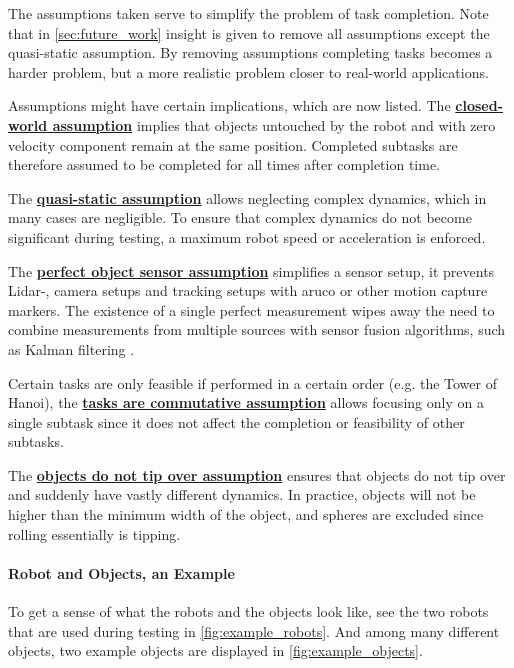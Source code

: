 The assumptions taken serve to simplify the problem of task completion. Note that in \cref{sec:future_work} insight is given to remove all assumptions except the quasi-static assumption. By removing assumptions completing tasks becomes a harder problem, but a more realistic problem closer to real-world applications.\bs

Assumptions might have certain implications, which are now listed. The \hyperref[assumption:closed_world]{\textbf{closed-world assumption}} implies that objects untouched by the robot and with zero velocity component remain at the same position. Completed subtasks are therefore assumed to be completed for all times after completion time.\bs

The \hyperref[assumption:quasi_static]{\textbf{quasi-static assumption}} allows neglecting complex dynamics, which in many cases are negligible. To ensure that complex dynamics do not become significant during testing, a maximum robot speed or acceleration is enforced.\bs

The \hyperref[assumption:perfect_object_sensor]{\textbf{perfect object sensor assumption}} simplifies a sensor setup, it prevents Lidar-, camera setups and tracking setups with aruco or other motion capture markers. The existence of a single perfect measurement wipes away the need to combine measurements from multiple sources with sensor fusion algorithms, such as Kalman filtering \cite{verhaegen_filtering_2007}.\bs

Certain tasks are only feasible if performed in a certain order (e.g. the Tower of Hanoi), the \hyperref[assumption:order_does_not_matter]{\textbf{tasks are commutative assumption}} allows focusing only on a single subtask since it does not affect the completion or feasibility of other subtasks.\bs

The \hyperref[assumption:no_tipping]{\textbf{objects do not tip over assumption}} ensures that objects do not tip over and suddenly have vastly different dynamics. In practice, objects will not be higher than the minimum width of the object, and spheres are excluded since rolling essentially is tipping. 

\paragraph{Robot and Objects, an Example}
To get a sense of what the robots and the objects look like, see the two robots that are used during testing in \cref{fig:example_robots}. And among many different objects, two example objects are displayed in \cref{fig:example_objects}.

